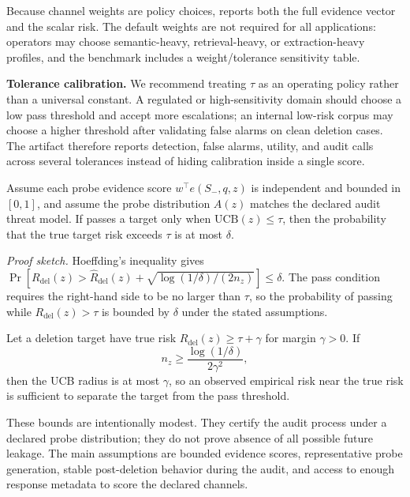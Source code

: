 Because channel weights are policy choices, \method{} reports both the full evidence vector and the scalar risk. The default weights are not required for all applications: operators may choose semantic-heavy, retrieval-heavy, or extraction-heavy profiles, and the benchmark includes a weight/tolerance sensitivity table.

\textbf{Tolerance calibration.}
We recommend treating $\tau$ as an operating policy rather than a universal constant. A regulated or high-sensitivity domain should choose a low pass threshold and accept more escalations; an internal low-risk corpus may choose a higher threshold after validating false alarms on clean deletion cases. The artifact therefore reports detection, false alarms, utility, and audit calls across several tolerances instead of hiding calibration inside a single score.

\begin{proposition}
Assume each probe evidence score $w^\top e(S_-,q,z)$ is independent and bounded in $[0,1]$, and assume the probe distribution $A(z)$ matches the declared audit threat model. If \method{} passes a target only when $\mathrm{UCB}(z)\leq \tau$, then the probability that the true target risk exceeds $\tau$ is at most $\delta$.
\end{proposition}

\textit{Proof sketch.}
Hoeffding's inequality gives
$\Pr[R_{\mathrm{del}}(z) > \hat R_{\mathrm{del}}(z)+\sqrt{\log(1/\delta)/(2n_z)}]\leq\delta$.
The pass condition requires the right-hand side to be no larger than $\tau$, so the probability of passing while $R_{\mathrm{del}}(z)>\tau$ is bounded by $\delta$ under the stated assumptions.

\begin{proposition}
Let a deletion target have true risk $R_{\mathrm{del}}(z)\geq\tau+\gamma$ for margin $\gamma>0$. If
\[
n_z \geq \frac{\log(1/\delta)}{2\gamma^2},
\]
then the UCB radius is at most $\gamma$, so an observed empirical risk near the true risk is sufficient to separate the target from the pass threshold.
\end{proposition}

These bounds are intentionally modest. They certify the audit process under a declared probe distribution; they do not prove absence of all possible future leakage. The main assumptions are bounded evidence scores, representative probe generation, stable post-deletion behavior during the audit, and access to enough response metadata to score the declared channels.

